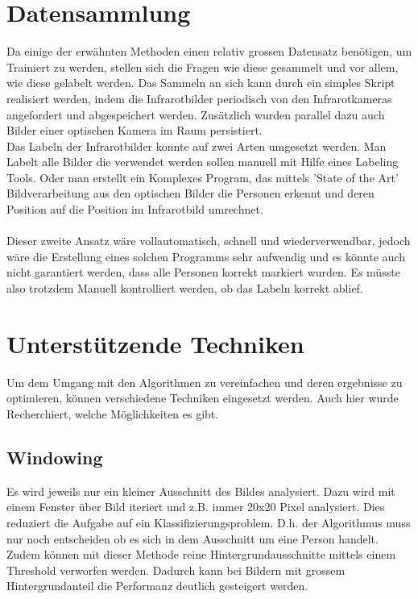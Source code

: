 \section{Datensammlung}

Da einige der erwähnten Methoden einen relativ grossen Datensatz benötigen, um Trainiert zu werden, stellen sich die Fragen wie diese gesammelt und vor allem, wie diese gelabelt werden. Das Sammeln an sich kann durch ein simples Skript realisiert werden, indem die Infrarotbilder periodisch von den Infrarotkameras angefordert und abgespeichert werden. Zusätzlich wurden parallel dazu auch Bilder einer optischen Kamera im Raum persistiert.\\
Das Labeln der Infrarotbilder konnte auf zwei Arten umgesetzt werden. Man Labelt alle Bilder die verwendet werden sollen manuell mit Hilfe eines Labeling Tools. Oder man erstellt ein Komplexes Program, das mittels 'State of the Art' Bildverarbeitung aus den optischen Bilder die Personen erkennt und deren Position auf die Position im Infrarotbild umrechnet.\\
\\
Dieser zweite Ansatz wäre vollautomatisch, schnell und wiederverwendbar, jedoch wäre die Erstellung eines solchen Programms sehr aufwendig und es könnte auch nicht garantiert werden, dass alle Personen korrekt markiert wurden. Es müsste also trotzdem Manuell kontrolliert werden, ob das Labeln korrekt ablief. 

\section{Unterstützende Techniken}

Um dem Umgang mit den Algorithmen zu vereinfachen und deren ergebnisse zu optimieren, können verschiedene Techniken eingesetzt werden. Auch hier wurde Recherchiert, welche Möglichkeiten es gibt.

\subsection{Windowing}

Es wird jeweils nur ein kleiner Ausschnitt des Bildes analysiert. Dazu wird mit einem Fenster über Bild iteriert und z.B. immer 20x20 Pixel analysiert. Dies reduziert die Aufgabe auf ein Klassifizierungsproblem. D.h. der Algorithmus muss nur noch entscheiden ob es sich in dem Ausschnitt um eine Person handelt. Zudem können mit dieser Methode reine Hintergrundausschnitte mittels einem Threshold verworfen werden. Dadurch kann bei Bildern mit grossem Hintergrundanteil die Performanz deutlich gesteigert werden.

